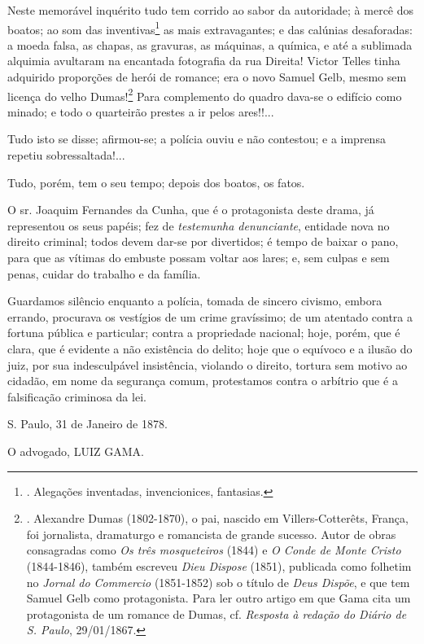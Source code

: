 Neste memorável inquérito tudo tem corrido ao sabor da autoridade; à
mercê dos boatos; ao som das inventivas\footnote{. Alegações inventadas,
  invencionices, fantasias.} as mais extravagantes; e das calúnias
desaforadas: a moeda falsa, as chapas, as gravuras, as máquinas, a
química, e até a sublimada alquimia avultaram na encantada fotografia da
rua Direita! Victor Telles tinha adquirido proporções de herói de
romance; era o novo Samuel Gelb, mesmo sem licença do velho
Dumas!\footnote{. Alexandre Dumas (1802-1870), o pai, nascido em
  Villers-Cotterêts, França, foi jornalista, dramaturgo e romancista de
  grande sucesso. Autor de obras consagradas como \emph{Os três
  mosqueteiros} (1844) e \emph{O Conde de Monte Cristo} (1844-1846),
  também escreveu \emph{Dieu Dispose} (1851), publicada como folhetim no
  \emph{Jornal do Commercio} (1851-1852) sob o título de \emph{Deus
  Dispõe}, e que tem Samuel Gelb como protagonista. Para ler outro
  artigo em que Gama cita um protagonista de um romance de Dumas, cf.
  \emph{Resposta à redação do Diário de S. Paulo}, 29/01/1867.}
Par\protect\hypertarget{Secao_Sem_Titulo-13}{}{}a complemento do quadro
dava-se o edifício como minado; e todo o quarteirão prestes a ir pelos
ares!!...

Tudo isto se disse; afirmou-se; a polícia ouviu e não contestou; e a
imprensa repetiu sobressaltada!...

Tudo, porém, tem o seu tempo; depois dos boatos, os fatos.

O sr. Joaquim Fernandes da Cunha, que é o protagonista deste drama, já
representou os seus papéis; fez de \emph{testemunha denunciante},
entidade nova no direito criminal; todos devem dar-se por divertidos; é
tempo de baixar o pano, para que as vítimas do embuste possam voltar aos
lares; e, sem culpas e sem penas, cuidar do trabalho e da família.

Guardamos silêncio enquanto a polícia, tomada de sincero civismo, embora
errando, procurava os vestígios de um crime gravíssimo; de um atentado
contra a fortuna pública e particular; contra a propriedade nacional;
hoje, porém, que é clara, que é evidente a não existência do delito;
hoje que o equívoco e a ilusão do juiz, por sua indesculpável
insistência, violando o direito, tortura sem motivo ao cidadão, em nome
da segurança comum, protestamos contra o arbítrio que é a falsificação
criminosa da lei.

S. Paulo, 31 de Janeiro de 1878.

O advogado, LUIZ GAMA.

